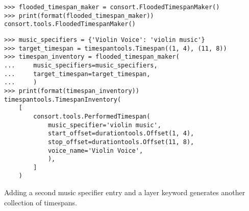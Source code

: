 \begin{singlespacing}
\vspace{-0.5\baselineskip}
\begin{lstlisting}
>>> flooded_timespan_maker = consort.FloodedTimespanMaker()
>>> print(format(flooded_timespan_maker))
consort.tools.FloodedTimespanMaker()
\end{lstlisting}
\end{singlespacing}

\begin{comment}
<abjad>
music_specifiers = {'Violin Voice': 'violin music'}
target_timespan = timespantools.Timespan((1, 4), (11, 8))
timespan_inventory = flooded_timespan_maker(
    music_specifiers=music_specifiers,
    target_timespan=target_timespan,
    )
print(format(timespan_inventory))
</abjad>
\end{comment}

\begin{singlespacing}
\vspace{-0.5\baselineskip}
\begin{lstlisting}
>>> music_specifiers = {'Violin Voice': 'violin music'}
>>> target_timespan = timespantools.Timespan((1, 4), (11, 8))
>>> timespan_inventory = flooded_timespan_maker(
...     music_specifiers=music_specifiers,
...     target_timespan=target_timespan,
...     )
>>> print(format(timespan_inventory))
timespantools.TimespanInventory(
    [
        consort.tools.PerformedTimespan(
            music_specifier='violin music',
            start_offset=durationtools.Offset(1, 4),
            stop_offset=durationtools.Offset(11, 8),
            voice_name='Violin Voice',
            ),
        ]
    )
\end{lstlisting}
\end{singlespacing}

Adding a second music specifier entry and a layer keyword generates another
collection of timespans.

\begin{comment}
<abjad>
music_specifiers = {
    'Violin Voice': 'violin music',
    'Cello Voice': 'cello music',
    }
timespan_inventory = flooded_timespan_maker(
    layer=3,
    music_specifiers=music_specifiers,
    target_timespan=target_timespan,
    )
print(format(timespan_inventory))
</abjad>
\end{comment}

